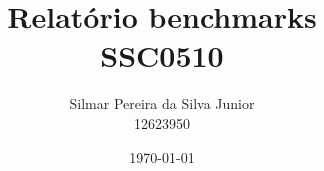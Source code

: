 




\renewcommand\and{\\[\baselineskip]}

\title{Relatório benchmarks \\ \Large \normalfont SSC0510}
\author{Silmar Pereira da Silva Junior \and 12623950}
\date{\today}




    



    \tableofcontents \pagebreak

    \listoffigures \pagebreak
    \listoftables \clearpage



